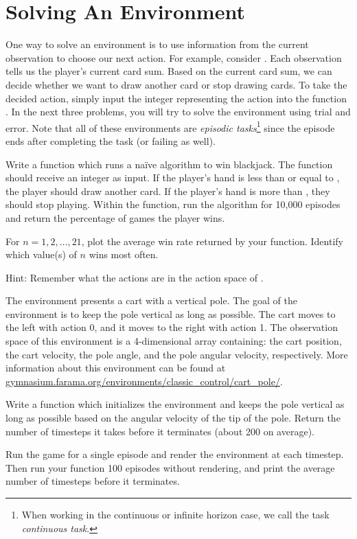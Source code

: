 \section*{Solving An Environment}

One way to solve an environment is to use information from the current observation to choose our next action.
For example, consider .
Each observation tells us the player's current card sum.
Based on the current card sum, we can decide whether we want to draw another card or stop drawing cards.
To take the decided action, simply input the integer representing the action into the function .
In the next three problems, you will try to solve the environment using trial and error.
Note that all of these environments are \emph{episodic tasks}\footnote{When working in the continuous or infinite horizon case, we call the task \emph{continuous task}.} since the episode ends after completing the task (or failing as well).

\begin{problem}
Write a function  which runs a na\"{i}ve algorithm to win blackjack.
The function should receive an integer  as input.
If the player's hand is less than or equal to , the player should draw another card.
If the player's hand is more than , they should stop playing.
Within the function, run the algorithm for 10,000 episodes and return the percentage of games the player wins.

For $n=1,2,\ldots,21$, plot the average win rate returned by your function.
Identify which value(s) of $n$ wins most often.

\noindent Hint: Remember what the actions are in the action space of .
\label{prob:blackjack}
\end{problem}

\begin{problem}
The environment  presents a cart with a vertical pole.
The goal of the environment is to keep the pole vertical as long as possible.
The cart moves to the left with action 0, and it moves to the right with action 1.
The observation space of this environment is a 4-dimensional array containing: the cart position, the cart velocity, the pole angle, and the pole angular velocity, respectively.
More information about this environment can be found at \url{gymnasium.farama.org/environments/classic_control/cart_pole/}.

Write a function  which initializes the  environment and keeps the pole vertical as long as possible based on the angular velocity of the tip of the pole.
Return the number of timesteps it takes before it terminates (about 200 on average).

Run the game for a single episode and render the environment at each timestep.
Then run your function 100 episodes without rendering, and print the average number of timesteps before it terminates.

\label{prob:cartpole}
\end{problem}

